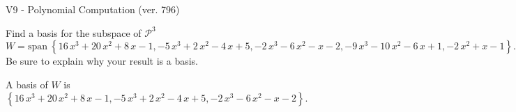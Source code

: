 \begin{exercise}
  \begin{exerciseTitle}V9 - Polynomial Computation (ver. 796)\end{exerciseTitle}
  \begin{exerciseStatement}
    Find a basis for the subspace of \(\mathcal{P}^3\) 
\[W=\mathrm{span}\ \left\{16 \, x^{3} + 20 \, x^{2} + 8 \, x - 1 , -5 \, x^{3} + 2 \, x^{2} - 4 \, x + 5 , -2 \, x^{3} - 6 \, x^{2} - x - 2 , -9 \, x^{3} - 10 \, x^{2} - 6 \, x + 1 , -2 \, x^{2} + x - 1\right\}.\]
 Be sure to explain why your result is a basis.


  \end{exerciseStatement}
  \begin{exerciseAnswer}
   A basis of \(W\) is  \(\left\{16 \, x^{3} + 20 \, x^{2} + 8 \, x - 1 , -5 \, x^{3} + 2 \, x^{2} - 4 \, x + 5 , -2 \, x^{3} - 6 \, x^{2} - x - 2\right\}\).
  


  \end{exerciseAnswer}
\end{exercise}